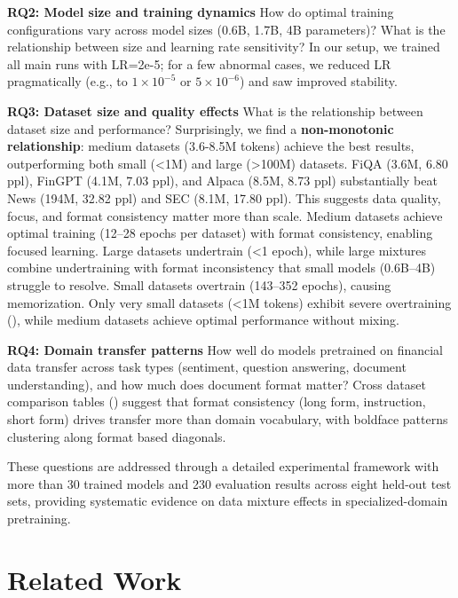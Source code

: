 \textbf{RQ2: Model size and training dynamics}
How do optimal training configurations vary across model sizes (0.6B, 1.7B, 4B parameters)? What is the relationship between size and learning rate sensitivity? In our setup, we trained all main runs with LR=2e-5; for a few abnormal cases, we reduced LR pragmatically (e.g., to $1\times10^{-5}$ or $5\times10^{-6}$) and saw improved stability.

\textbf{RQ3: Dataset size and quality effects}
What is the relationship between dataset size and performance? Surprisingly, we find a \textbf{non-monotonic relationship}: medium datasets (3.6-8.5M tokens) achieve the best results, outperforming both small (<1M) and large (>100M) datasets. FiQA (3.6M, 6.80 ppl), FinGPT (4.1M, 7.03 ppl), and Alpaca (8.5M, 8.73 ppl) substantially beat News (194M, 32.82 ppl) and SEC (8.1M, 17.80 ppl). This suggests data quality, focus, and format consistency matter more than scale. Medium datasets achieve optimal training (12–28 epochs per dataset) with format consistency, enabling focused learning. Large datasets undertrain (<1 epoch), while large mixtures combine undertraining with format inconsistency that small models (0.6B–4B) struggle to resolve. Small datasets overtrain (143–352 epochs), causing memorization. Only very small datasets (<1M tokens) exhibit severe overtraining (), while medium datasets achieve optimal performance without mixing.

\textbf{RQ4: Domain transfer patterns}
How well do models pretrained on financial data transfer across task types (sentiment, question answering, document understanding), and how much does document format matter? Cross dataset comparison tables () suggest that format consistency (long form, instruction, short form) drives transfer more than domain vocabulary, with boldface patterns clustering along format based diagonals.

These questions are addressed through a detailed experimental framework with more than 30 trained models and 230 evaluation results across eight held-out test sets, providing systematic evidence on data mixture effects in specialized-domain pretraining.

\section{Related Work}

